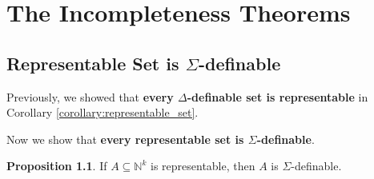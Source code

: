 \documentclass[11pt,letterpaper]{book}
\theoremstyle{definition}
\newtheorem{proposition}{Proposition}[section]
\begin{document}
\chapter{The Incompleteness Theorems}


\section{Representable Set is $\Sigma$-definable}

Previously, we showed that \textbf{every $\Delta$-definable set is representable} in Corollary \ref{corollary:representable_set}.

Now we show that \textbf{every representable set is $\Sigma$-definable}.

\begin{proposition}
\label{proposition:representable_Sigma_definable}
If $A \subseteq \mathbb{N}^k$ is representable, then $A$ is $\Sigma$-definable.
\end{proposition}
\end{document}
